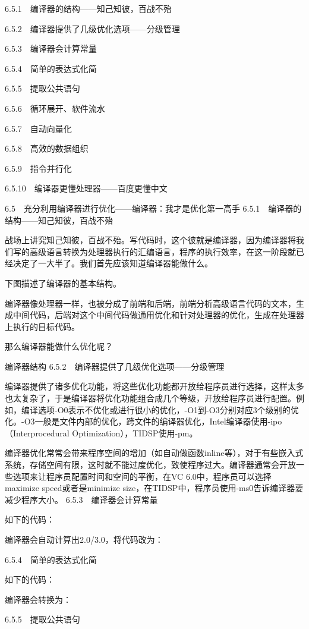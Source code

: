 \documentclass[12pt,UTF8]{ctexbook}
\begin{document}
6.5.1　编译器的结构——知己知彼，百战不殆

6.5.2　编译器提供了几级优化选项——分级管理

6.5.3　编译器会计算常量

6.5.4　简单的表达式化简

6.5.5　提取公共语句

6.5.6　循环展开、软件流水

6.5.7　自动向量化

6.5.8　高效的数据组织

6.5.9　指令并行化

6.5.10　编译器更懂处理器——百度更懂中文


6.5　充分利用编译器进行优化——编译器：我才是优化第一高手
6.5.1　编译器的结构——知己知彼，百战不殆

战场上讲究知己知彼，百战不殆。写代码时，这个彼就是编译器，因为编译器将我们写的高级语言转换为处理器执行的汇编语言，程序的执行效率，在这一阶段就已经决定了一大半了。我们首先应该知道编译器能做什么。

下图描述了编译器的基本结构。

编译器像处理器一样，也被分成了前端和后端，前端分析高级语言代码的文本，生成中间代码，后端对这个中间代码做通用优化和针对处理器的优化，生成在处理器上执行的目标代码。

那么编译器能做什么优化呢？

编译器结构
6.5.2　编译器提供了几级优化选项——分级管理

编译器提供了诸多优化功能，将这些优化功能都开放给程序员进行选择，这样太多也太复杂了，于是编译器将优化功能组合成几个等级，开放给程序员进行配置。例如，编译选项-O0表示不优化或进行很小的优化，-O1到-O3分别对应3个级别的优化。-O3一般是文件内部的优化，跨文件的编译器优化，Intel编译器使用-ipo（Interprocedural Optimization），TIDSP使用-pm。

编译器优化常常会带来程序空间的增加（如自动做函数inline等），对于有些嵌入式系统，存储空间有限，这时就不能过度优化，致使程序过大。编译器通常会开放一些选项来让程序员配置时间和空间的平衡，在VC 6.0中，程序员可以选择maximize speed或者是minimize size，在TIDSP中，程序员使用-ms0告诉编译器要减少程序大小。
6.5.3　编译器会计算常量

如下的代码：

编译器会自动计算出2.0/3.0，将代码改为：

6.5.4　简单的表达式化简

如下的代码：

编译器会转换为：

6.5.5　提取公共语句
\end{document}
